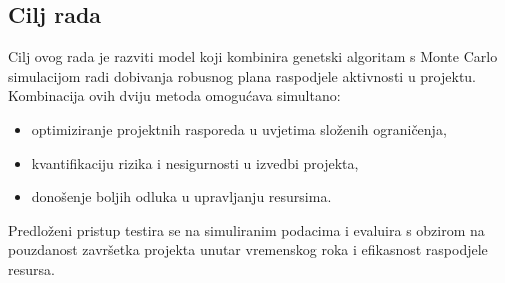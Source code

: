 \subsection{Cilj rada}

Cilj ovog rada je razviti model koji kombinira genetski algoritam s Monte Carlo simulacijom radi dobivanja robusnog plana raspodjele aktivnosti u projektu. Kombinacija ovih dviju metoda omogućava simultano:
\begin{itemize}
    \item optimiziranje projektnih rasporeda u uvjetima složenih ograničenja,
    \item kvantifikaciju rizika i nesigurnosti u izvedbi projekta,
    \item donošenje boljih odluka u upravljanju resursima.
\end{itemize}

Predloženi pristup testira se na simuliranim podacima i evaluira s obzirom na pouzdanost završetka projekta unutar vremenskog roka i efikasnost raspodjele resursa.

